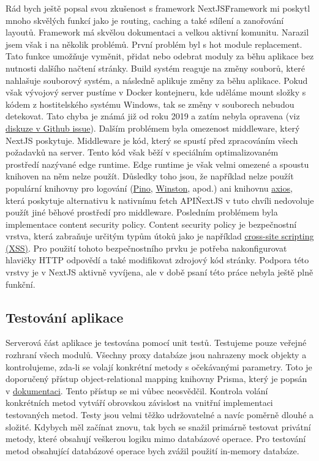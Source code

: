 Rád bych ještě popsal svou zkušenost s framework NextJS\.
Framework mi poskytl mnoho skvělých funkcí jako je routing, caching a také sdílení a zanořování layoutů.
Framework má skvělou dokumentaci a velkou aktivní komunitu.
Narazil jsem však i na několik problémů.
První problém byl s hot module replacement.
Tato funkce umožňuje vyměnit, přidat nebo odebrat moduly za běhu aplikace bez nutnosti dalšího načtení stránky.
Build systém reaguje na změny souborů, které nahlašuje souborový systém, a následně aplikuje změny za běhu aplikace.
Pokud však vývojový server pustíme v Docker kontejneru, kde uděláme mount složky s kódem z hostitelského systému Windows, tak se změny v souborech nebudou detekovat.
Tato chyba je známá již od roku 2019 a zatím nebyla opravena (viz \href{https://github.com/microsoft/WSL/issues/4739}{diskuze v Github issue}).
Dalším problémem byla omezenost middleware, který NextJS poskytuje.
Middleware je kód, který se spustí před zpracováním všech požadavků na server.
Tento kód však běží v speciálním optimalizovaném prostředí nazývané edge runtime.
Edge runtime je však velmi omezené a spoustu knihoven na něm nelze použít.
Důsledky toho jsou, že například nelze použít populární knihovny pro logování (\href{https://github.com/pinojs/pino}{Pino}, \href{https://github.com/winstonjs/winston}{Winston}, apod.) ani knihovnu \href{https://github.com/axios/axios}{axios}, která poskytuje alternativu k nativnímu fetch API\.
NextJS v tuto chvíli nedovoluje použít jiné běhové prostředí pro middleware.
Posledním problémem byla implementace content security policy.
Content security policy je bezpečnostní vrstva, která zabraňuje určitým typům útoků jako je například \href{https://developer.mozilla.org/en-US/docs/Glossary/Cross-site_scripting}{cross-site scripting (XSS)}.
Pro použití tohoto bezpečnostního prvku je potřeba nakonfigurovat hlavičky HTTP odpovědí a také modifikovat zdrojový kód stránky.
Podpora této vrstvy je v NextJS aktivně vyvíjena, ale v době psaní této práce nebyla ještě plně funkční.

\subsection{Testování aplikace}\label{subsec:testovani-aplikace}

Serverová část aplikace je testována pomocí unit testů.
Testujeme pouze veřejné rozhraní všech modulů.
Všechny proxy databáze jsou nahrazeny mock objekty a kontrolujeme, zda-li se volají konkrétní metody s očekávanými parametry.
Toto je doporučený přístup object-relational mapping knihovny Prisma, který je popsán v \href{https://www.prisma.io/docs/guides/testing/unit-testing}{dokumentaci}.
Tento přístup se mi vůbec neosvědčil.
Kontrola volání konkrétních metod vytváří obrovskou závislost na vnitřní implementaci testovaných metod.
Testy jsou velmi těžko udržovatelné a navíc poměrně dlouhé a složité.
Kdybych měl začínat znovu, tak bych se snažil primárně testovat privátní metody, které obsahují veškerou logiku mimo databázové operace.
Pro testování metod obsahující databázové operace bych zvážil použití in-memory databáze.

